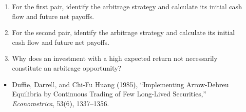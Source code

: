 \begin{enumerate}
\begin{enumerate}

\item For the first pair, identify the arbitrage
strategy and calculate its initial cash flow
and future net payoffs.

\item For the second pair, identify the arbitrage
strategy and calculate its initial cash flow
and future net payoffs.

\item Why does an investment with a high expected
return not necessarily constitute an arbitrage
opportunity?

\end{enumerate}


\end{enumerate}


\begin{itemize}

\item Duffie, Darrell, and Chi-Fu Huang (1985),
``Implementing Arrow-Debreu Equilibria by Continuous Trading of Few Long-Lived Securities,''
\emph{Econometrica}, 53(6), 1337--1356.

\end{itemize}

